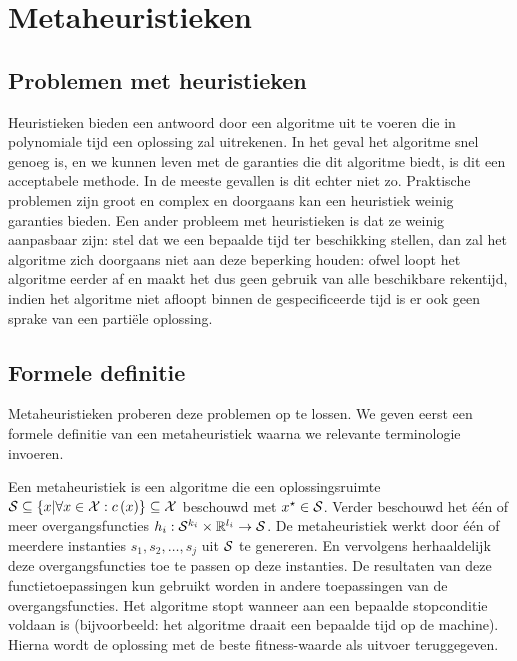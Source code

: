 

\section{Metaheuristieken}

\subsection{Problemen met heuristieken}

Heuristieken bieden een antwoord door een algoritme uit te voeren die in polynomiale tijd een oplossing zal uitrekenen. In het geval het algoritme snel genoeg is, en we kunnen leven met de garanties die dit algoritme biedt, is dit een acceptabele methode. In de meeste gevallen is dit echter niet zo. Praktische problemen zijn groot en complex en doorgaans kan een heuristiek weinig garanties bieden. Een ander probleem met heuristieken is dat ze weinig aanpasbaar zijn: stel dat we een bepaalde tijd ter beschikking stellen, dan zal het algoritme zich doorgaans niet aan deze beperking houden: ofwel loopt het algoritme eerder af en maakt het dus geen gebruik van alle beschikbare rekentijd, indien het algoritme niet afloopt binnen de gespecificeerde tijd is er ook geen sprake van een parti\"ele oplossing.

\subsection{Formele definitie}

Metaheuristieken proberen deze problemen op te lossen. We geven eerst een formele definitie van een metaheuristiek waarna we relevante terminologie invoeren.

\begin{definition}[Metaheuristiek]
Een metaheuristiek is een algoritme die een oplossingsruimte $\mathcal{S}\subseteq\left\{ x|\forall x\in \mathcal{X}:c\left(x\right)\right\}\subseteq\mathcal{X}$ beschouwd met $x^{\star}\in\mathcal{S}$. Verder beschouwd het \'e\'en of meer overgangsfuncties $h_i:\mathcal{S}^{k_i}\times\mathbb{R}^{l_i}\rightarrow\mathcal{S}$. De metaheuristiek werkt door \'e\'en of meerdere instanties $s_1,s_2,\ldots,s_j$ uit $\mathcal{S}$ te genereren. En vervolgens herhaaldelijk deze overgangsfuncties toe te passen op deze instanties. De resultaten van deze functietoepassingen kun gebruikt worden in andere toepassingen van de overgangsfuncties. Het algoritme stopt wanneer aan een bepaalde stopconditie voldaan is (bijvoorbeeld: het algoritme draait een bepaalde tijd op de machine). Hierna wordt de oplossing met de beste fitness-waarde als uitvoer teruggegeven.
\end{definition}

